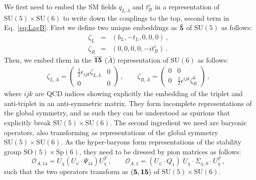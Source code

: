 \documentclass[preprintnumbers,nofootinbib,showpacs,eqsecnum,pre,12pt]{revtex4-1}
\newcommand{\SO}{\text{SO}}
\newcommand{\SU}{\text{SU}}
\newcommand{\Sp}{\text{Sp}}
\begin{document}
We first need to embed the SM fields $q_{L,3}$ and $t_R^c$ in a representation of $\SU(5) \times \SU(6)$ 
to write down the couplings to the top, second term in Eq.~\eqref{eq:LagB}. First we define two unique embeddings as $\bf \bar{5}$ of $\SU(5)$ as follows:
\begin{subequations}
\begin{eqnarray} 
\zeta_L &=&  (b_L,-t_L,0,0,0)\, , \\
\zeta_R &=&  (0,0,0,0, -i t^c_R)\, .
\end{eqnarray}
\end{subequations}
Then, we embed them in the $\bf \overline{15}$ ($\bar{A}$) representation of $\SU(6)$ as follows:
 \begin{eqnarray}
 \zeta_{L,\bar{A}} = \begin{pmatrix}   \frac 12 \epsilon_{ijk} \zeta_{L,k}  & 0 \\ 0  & 0 \end{pmatrix} \,, \qquad
 \zeta_{R,\bar{A}} = \begin{pmatrix}  0  & 0 \\ 0  & \frac 12 \epsilon^{ijk} \zeta_R^k  \end{pmatrix} \,,
\end{eqnarray}
where $ijk$ are QCD indices showing explicitly the embedding of the triplet and anti-triplet in an anti-symmetric matrix.
They form incomplete representations of the global symmetry, and as such they can be understood as spurions that explicitly break $\SU(5) \times \SU(6)$. 
The second ingredient we need are baryonic operators, also transforming as representations of the global symmetry $\SU(5) \times \SU(6)$. As the hyper-baryons form representations of the stability group $\SO(5) \times \Sp(6)$, they need to be dressed by pion matrices as follows:
\begin{equation}\label{eq:dressedoperators}
    \mathcal{O}_{A,14} = U_\chi \left( U_\psi \cdot \Psi_{14} \right) U_\chi^T\,, \qquad \mathcal{O}_{A,1} = \left( U_\psi \cdot Q_1 \right)\; U_\chi \cdot \Sigma_{\chi,0} \cdot U_\chi^T\,,
\end{equation}
such that the two operators transform as $({\bf 5},{\bf 15})$ of $\SU(5) \times \SU(6)$.
\end{document}
